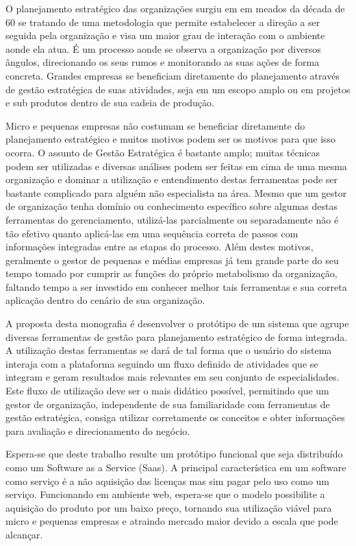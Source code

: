 \documentclass{abnt}
\begin{document}
O planejamento estratégico das organizações surgiu em em meados da década de 60
se tratando de uma metodologia que permite estabelecer a direção a ser seguida
pela organização e visa um maior grau de interação com o ambiente aonde ela
atua. É um processo aonde se observa a organização por diversos ângulos,
direcionando os seus rumos e monitorando as suas ações de forma concreta.
Grandes empresas se beneficiam diretamente do planejamento através de gestão
estratégica de suas atividades, seja em um escopo amplo ou em projetos e sub
produtos dentro de sua cadeia de produção.

Micro e pequenas empresas não costumam se beneficiar diretamente do planejamento
estratégico e muitos motivos podem ser os motivos para que isso ocorra. O
assunto de Gestão Estratégica é bastante amplo; muitas técnicas podem ser
utilizadas e diversas análises podem ser feitas em cima de uma mesma organização
e dominar a utilização e entendimento destas ferramentas pode ser bastante
complicado para alguém não especialista na área. Mesmo que um gestor de
organização tenha domínio ou conhecimento específico sobre algumas destas
ferramentas do gerenciamento, utilizá-las parcialmente ou separadamente não é
tão efetivo quanto aplicá-las em uma sequência correta de passos com informações
integradas entre as etapas do processo. Além destes motivos, geralmente o gestor
de pequenas e médias empresas já tem grande parte do seu tempo tomado por
cumprir as funções do próprio metabolismo da organização, faltando tempo a ser
investido em conhecer melhor tais ferramentas e sua correta aplicação dentro do
cenário de sua organização.

A proposta desta monografia é desenvolver o protótipo de um sistema que agrupe
diversas ferramentas de gestão para planejamento estratégico de forma integrada.
A utilização destas ferramentas se dará de tal forma que o usuário do sistema
interaja com a plataforma seguindo um fluxo definido de atividades que se
integram e geram resultados mais relevantes em seu conjunto de especialidades.
Este fluxo de utilização deve ser o mais didático possível, permitindo que um
gestor de organização, independente de sua familiaridade com ferramentas de
gestão estratégica, consiga utilizar corretamente os conceitos e obter
informações para avaliação e direcionamento do negócio.

Espera-se que deste trabalho resulte um protótipo funcional que seja distribuído
como um Software as a Service (Saas)\cite{Turner2003}. A principal
característica em um software como serviço é a não aquisição das licenças mas
sim pagar pelo uso como um serviço. Funcionando em ambiente web, espera-se que
o modelo possibilite a aquisição do produto por um baixo preço, tornando sua
utilização viável para micro e pequenas empresas e atraindo mercado maior devido
a escala que pode alcançar.
\end{document}
